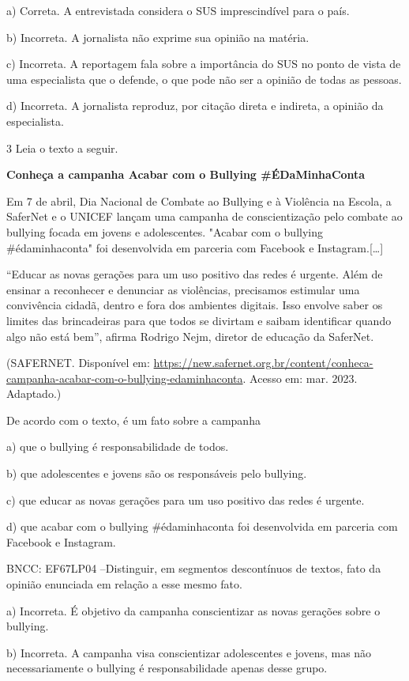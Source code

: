 a) Correta. A entrevistada considera o SUS imprescindível para o país.

b) Incorreta. A jornalista não exprime sua opinião na matéria.

c) Incorreta. A reportagem fala sobre a importância do SUS no ponto de
vista de uma especialista que o defende, o que pode não ser a opinião de
todas as pessoas.

d) Incorreta. A jornalista reproduz, por citação direta e indireta, a
opinião da especialista.

\num{3} Leia o texto a seguir.

\textbf{Conheça a campanha Acabar com o Bullying \#ÉDaMinhaConta}

Em 7 de abril, Dia Nacional de Combate ao Bullying e à Violência na
Escola, a SaferNet e o UNICEF lançam uma campanha de conscientização
pelo combate ao bullying focada em jovens e adolescentes. "Acabar com o
bullying \#édaminhaconta" foi desenvolvida em parceria com Facebook e
Instagram.{[}\ldots{}{]}

``Educar as novas gerações para um uso positivo das redes é urgente.
Além de ensinar a reconhecer e denunciar as violências, precisamos
estimular uma convivência cidadã, dentro e fora dos ambientes digitais.
Isso envolve saber os limites das brincadeiras para que todos se
divirtam e saibam identificar quando algo não está bem'', afirma Rodrigo
Nejm, diretor de educação da SaferNet.

(SAFERNET. Disponível em: 
\url{https://new.safernet.org.br/content/conheca-campanha-acabar-com-o-bullying-edaminhaconta}.
Acesso em: mar. 2023. Adaptado.)

De acordo com o texto, é um fato sobre a campanha

a) que o bullying é responsabilidade de todos.

b) que adolescentes e jovens são os responsáveis pelo bullying.

c) que educar as novas gerações para um uso positivo das redes é
urgente.

d) que acabar com o bullying \#édaminhaconta foi desenvolvida em
parceria com Facebook e Instagram.

BNCC: EF67LP04 --Distinguir, em segmentos descontínuos de textos, fato
da opinião enunciada em relação a esse mesmo fato.

a) Incorreta. É objetivo da campanha conscientizar as novas gerações
sobre o bullying.

b) Incorreta. A campanha visa conscientizar adolescentes e jovens, mas
não necessariamente o bullying é responsabilidade apenas desse grupo.

